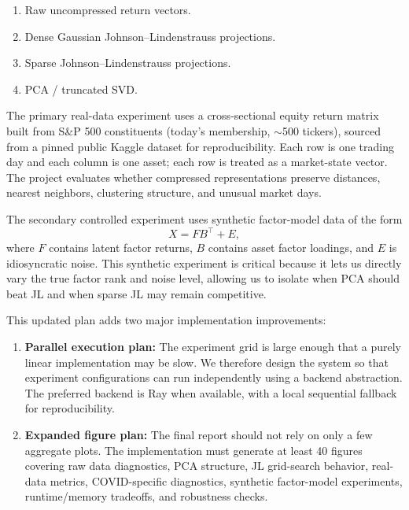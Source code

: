 \documentclass[11pt]{article}
\begin{document}
\begin{enumerate}
    \item Raw uncompressed return vectors.
    \item Dense Gaussian Johnson--Lindenstrauss projections.
    \item Sparse Johnson--Lindenstrauss projections.
    \item PCA / truncated SVD.
\end{enumerate}

The primary real-data experiment uses a cross-sectional equity return matrix built from S\&P 500 constituents (today's membership, $\sim$500 tickers), sourced from a pinned public Kaggle dataset for reproducibility. Each row is one trading day and each column is one asset; each row is treated as a market-state vector. The project evaluates whether compressed representations preserve distances, nearest neighbors, clustering structure, and unusual market days.

The secondary controlled experiment uses synthetic factor-model data of the form
\[
X = F B^\top + E,
\]
where $F$ contains latent factor returns, $B$ contains asset factor loadings, and $E$ is idiosyncratic noise. This synthetic experiment is critical because it lets us directly vary the true factor rank and noise level, allowing us to isolate when PCA should beat JL and when sparse JL may remain competitive.

This updated plan adds two major implementation improvements:

\begin{enumerate}
    \item \textbf{Parallel execution plan:} The experiment grid is large enough that a purely linear implementation may be slow. We therefore design the system so that experiment configurations can run independently using a backend abstraction. The preferred backend is Ray when available, with a local sequential fallback for reproducibility.

    \item \textbf{Expanded figure plan:} The final report should not rely on only a few aggregate plots. The implementation must generate at least 40 figures covering raw data diagnostics, PCA structure, JL grid-search behavior, real-data metrics, COVID-specific diagnostics, synthetic factor-model experiments, runtime/memory tradeoffs, and robustness checks.
\end{enumerate}

\end{document}
